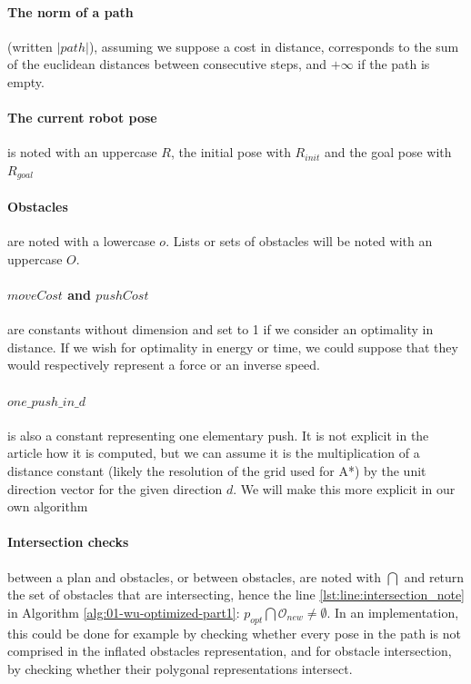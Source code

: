 \paragraph{The norm of a path} (written $|path|$), assuming we suppose a cost in distance,  corresponds to the sum of the euclidean distances between consecutive steps, and $+\infty$ if the path is empty.

\paragraph{The current robot pose} is noted with an uppercase $R$, the initial pose with $R_{init}$ and the goal pose with $R_{goal}$

\paragraph{Obstacles} are noted with a lowercase $o$. Lists or sets of obstacles will be noted with an uppercase $O$.

\paragraph{$moveCost$ and $pushCost$} are constants without dimension and set to 1 if we consider an optimality in distance. If we wish for optimality in energy or time, we could suppose that they would respectively represent a force or an inverse speed.

\paragraph{$one\_push\_in\_d$} is also a constant representing one elementary push. It is not explicit in the article how it is computed, but we can assume it is the multiplication of a distance constant (likely the resolution of the grid used for A*) by the unit direction vector for the given direction $d$. We will make this more explicit in our own algorithm

\paragraph{Intersection checks} between a plan and obstacles, or between obstacles, are noted with $\bigcap$ and return the set of obstacles that are intersecting, hence the line \ref{lst:line:intersection_note} in Algorithm \ref{alg:01-wu-optimized-part1}: $p_{opt} \bigcap \mathcal{O}_{new} \neq \emptyset$. In an implementation, this could be done for example by checking whether every pose in the path is not comprised in the inflated obstacles representation, and for obstacle intersection, by checking whether their polygonal representations intersect.

